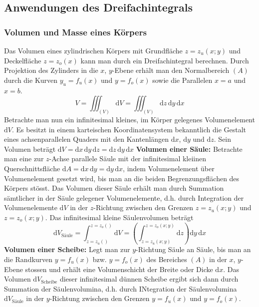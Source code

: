 \subsection{Anwendungen des Dreifachintegrals}
\subsubsection{Volumen und Masse eines Körpers}
Das Volumen eines zylindrischen Körpers mit Grundfläche $z=z_u\left(x; y\right)$ und Deckelfläche $z=z_o\left(x\right)$ kann man durch ein Dreifachintegral berechnen. Durch Projektion des Zylinders in die $x$, $y$-Ebene erhält man den Normalbereich $\left(A\right)$ durch die Kurven $y_u=f_u\left(x\right)$ und $y=f_o\left(x\right)$ sowie die Parallelen $x=a$ und $x=b$.
\begin{equation}
\boxed{V=\displaystyle \iiint_{\left(V\right)}\text{d}V=\displaystyle \iiint_{\left(V\right)}\text{d}z\,\text{d}y\,\text{d}x}
\end{equation}
Betrachte man nun ein infinitesimal kleines, im Körper gelegenes Volumenelement $\text{d}V$. Es besitzt in einem karteischen Koordinatensystem bekanntlich die Gestalt eines achsenparallelen Quaders mit den Kantenlängen $\text{d}x$, $\text{d}y$ und $\text{d}z$. Sein Volumen beträgt $\text{d}V=\text{d}x\,\text{d}y\,\text{d}z=\text{d}z\,\text{d}y\,\text{d}x$
\newline\newline
\textbf{Volumen einer Säule:} Betrachte man eine zur $z$-Achse parallele Säule mit der infinitesimal kleiinen Querschnittsfläche $\text{d}A=\text{d}x\,\text{d}y=\text{d}y\,\text{d}x$, indem Volumenelement über Volumenelement gesetzt wird, bis man an die beiden Begrenzungsflächen des Körpers stösst. Das Volumen dieser Säule erhält man durch Summation sämtlicher in der Säule gelegener Volumenelemente, d.h. durch Integration der Volumenelemente $\text{d}V$ in der $z$-Richtung zwischen den Grenzen $z=z_u\left(x; y\right)$ und $z=z_o\left(x; y\right)$. Das infinitesimal kleine Säulenvolumen beträgt
\begin{equation}
\boxed{\text{d}V_{\text{Säule}}=\displaystyle \int_{z=z_u\left(\right)}^{z=z_o\left(\right)}\text{d}V=\left(\displaystyle \int_{z=z_u\left(x; y\right)}^{z=z_o\left(x; y\right)}\text{d}z\right)\text{d}y\,\text{d}x}
\end{equation}
\textbf{Volumen einer Scheibe:} Legt man zur $y$-Richtung Säule an Säule, bis man an die Randkurven $y=f_u\left(x\right)$ bzw. $y=f_o\left(x\right)$ des Bereiches $\left(A\right)$ in der $x$, $y$-Ebene stossen und erhält eine Volumenschicht der Breite oder Dicke $\text{d}x$. Das Volumen $\text{d}V_{\text{Scheibe}}$ dieser infinitesimal dünnen Scheibe ergibt sich dann durch Summation der Säulenvolumina, d.h. durch INtegration der Säulenvolumina $\text{d}V_{\text{Säule}}$ in der $y$-Richtung zwischen den Grenzen $y=f_u\left(x\right)$ und $y=f_o\left(x\right)$.  
